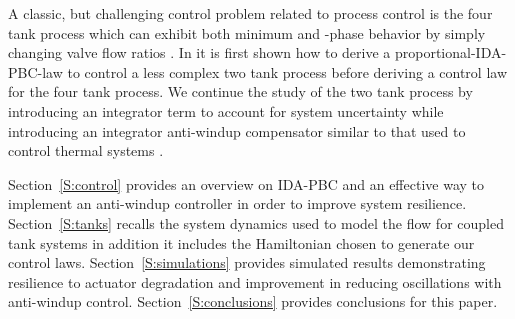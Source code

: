 A classic, but challenging control problem related to process control
is the four tank process which can exhibit both
minimum and \nonminimum-phase behavior by simply changing valve flow ratios
\cite{johansson00:_quadr_tank_proces,
  johnsen07:_inter_and_dampin_assig_passiv}.  In
\cite{johnsen07:_inter_and_dampin_assig_passiv} it is first shown how
to derive a proportional-IDA-PBC-law to control a less complex two tank
process before deriving a control law for the four tank process.  We
continue the study of the two tank process by introducing an integrator
term to account for system uncertainty while introducing an integrator
anti-windup compensator similar to that used to control thermal
systems \cite{fu10:_feedb_therm_contr_for_real_time_system}.

Section~\ref{S:control} provides an overview on IDA-PBC and an
effective way to implement an anti-windup controller in order to
improve system resilience.  Section~\ref{S:tanks} recalls the system
dynamics used to model the flow for coupled tank systems in addition
it includes the Hamiltonian chosen to generate our control laws.
Section~\ref{S:simulations} provides simulated results demonstrating
resilience to actuator degradation and improvement in reducing
oscillations with anti-windup control.  Section~\ref{S:conclusions}
provides conclusions for this paper.
